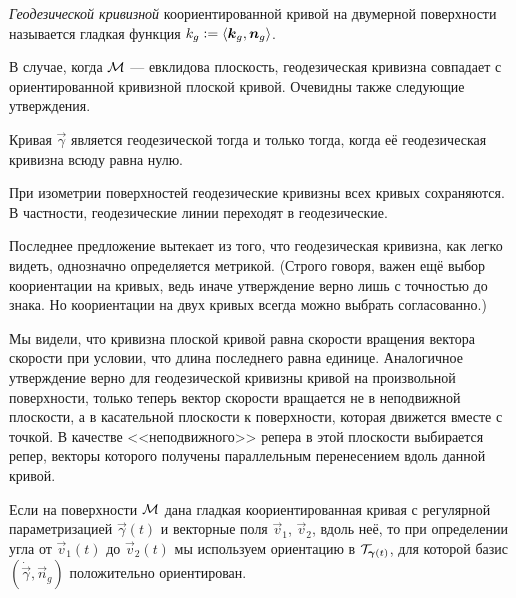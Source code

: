 \begin{definition}
	\textit{Геодезической кривизной} коориентированной кривой на двумерной поверхности называется гладкая функция $k_g\vcentcolon = \langle\vec{k}_g, \vec{n}_g\rangle$.
\end{definition}

В случае, когда $\M$ --- евклидова плоскость, геодезическая кривизна совпадает с ориентированной кривизной плоской кривой. Очевидны также следующие утверждения.

\begin{proposition}
	Кривая $\vec{\gamma}$ является геодезической тогда и только тогда, когда её геодезическая кривизна всюду равна нулю.
\end{proposition}

\begin{proposition}
	При изометрии поверхностей геодезические кривизны всех кривых сохраняются. В частности, геодезические линии переходят в геодезические.
\end{proposition}

Последнее предложение вытекает из того, что геодезическая кривизна, как легко видеть, однозначно определяется метрикой. (Строго говоря, важен ещё выбор коориентации на кривых, ведь иначе утверждение верно лишь с точностью до знака. Но коориентации на двух кривых всегда можно выбрать согласованно.)

Мы видели, что кривизна плоской кривой равна скорости вращения вектора скорости при условии, что длина последнего равна единице. Аналогичное утверждение верно для геодезической кривизны кривой на произвольной поверхности, только теперь вектор скорости вращается не в неподвижной плоскости, а в касательной плоскости к поверхности, которая движется вместе с точкой. В качестве <<неподвижного>> репера в этой плоскости выбирается репер, векторы которого получены параллельным перенесением вдоль данной кривой.

Если на поверхности $\M$ дана гладкая коориентированная кривая с регулярной параметризацией $\vec{\gamma}(t)$ и векторные поля $\vec{v}_1$, $\vec{v}_2$, вдоль неё, то при определении угла от $\vec{v}_1(t)$ до $\vec{v}_2(t)$ мы используем ориентацию в $\T_{\vec{\gamma}(t)}$, для которой базис $(\dot{\vec{\gamma}}, \vec{n}_g)$ положительно ориентирован\footnotemark{}.


